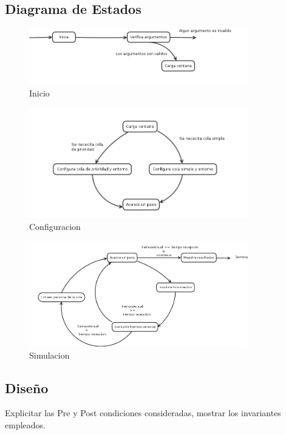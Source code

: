 \documentclass[11pt]{utalcaDoc}
\begin{document}
  \subsection{Diagrama de Estados}
  		\begin{figure}[H]
  			\centering
    		\includegraphics[width=0.85\textwidth]{etapa1}
  			\caption{Inicio}
		\end{figure}
  		\begin{figure}[H]
  			\centering
    		\includegraphics[width=0.85\textwidth]{etapa2}
  			\caption{Configuracion}
		\end{figure}
  		\begin{figure}[H]
  			\centering
    		\includegraphics[width=0.85\textwidth]{etapa3}
  			\caption{Simulacion}
		\end{figure}
  
  \subsection{Dise\~no} Explicitar las Pre y Post condiciones consideradas,
  mostrar los invariantes empleados.
\end{document}
